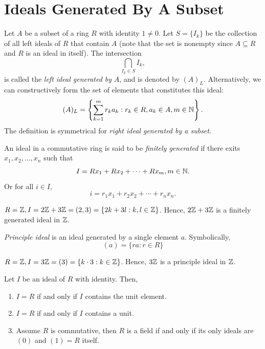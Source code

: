 \section{Ideals Generated By A Subset}
\begin{definition}
Let $A$ be a subset of a ring $R$ with identity $1 \neq 0$. Let $S = \{I_k\}$ be the collection of all left ideals of $R$ that contain $A$ (note that the set is nonempty since $A \subseteq R$ and $R$ is an ideal in itself). The intersection
\[
\bigcap_{I_k \in S} I_k,
\]
is called the \textit{left ideal generated by} $A$, and is denoted by $(A)_L$.
Alternatively, we can constructively form the set of elements that constitutes this ideal: 
\[(A)_L = \left\{\sum_{k=1}^{m}r_ka_k: r_k \in R, a_k\in A, m \in \mathbb{N}\right\}.\]
The definition is symmetrical for \textit{right ideal generated by a subset}.
\end{definition}
\begin{definition}
    An ideal in a commutative ring is said to be \textit{finitely generated} if there exits $x_1, x_2, ..., x_n$ such that 
    \[I = Rx_1 + Rx_2 + \cdots + Rx_m, m \in \mathbb{N}.\]
    Or for all $i \in I$,
    \[i = r_1 x_1 + r_2 x_2 + \cdots + r_nx_n.\]
\end{definition}
\begin{eg}
    $R = \mathbb{Z}, I = 2\mathbb{Z} + 3\mathbb{Z} = (2,3) = \{2k + 3l: k,l \in \mathbb{Z}\}$. Hence, $2\mathbb{Z} + 3\mathbb{Z}$ is a finitely generated ideal in $\mathbb{Z}$.
\end{eg}
\begin{definition}
    \textit{Principle ideal} is an ideal generated by a single element $a$. Symbolically,
    \[(a) = \{ra: r \in R\}\]
\end{definition}
\begin{eg}
    $R = \mathbb{Z}, I = 3\mathbb{Z} = (3) = \{k \cdot 3 : k \in \mathbb{Z}\}$. Hence, $3\mathbb{Z}$ is a principle ideal in $\mathbb{Z}$.
\end{eg}
\begin{prop}
    Let $I$ be an ideal of $R$ with identity. Then,
    \begin{enumerate}
        \item $I = R$ if and only if $I$ contains the unit element.
        \item $I = R$ if and only if $I$ contains a unit.
        \item Assume $R$ is commutative, then $R$ is a field if and only if its only ideals are $(0)$ and $(1)=R$ itself.
    \end{enumerate}
\end{prop}
